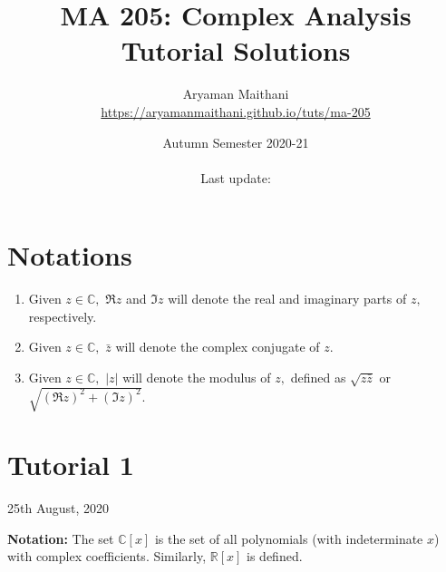 \documentclass[12pt]{article}
\title{MA 205: Complex Analysis\\\large{Tutorial Solutions}}
\author{Aryaman Maithani\\\url{https://aryamanmaithani.github.io/tuts/ma-205}}
\date{Autumn Semester 2020-21\\~\\Last update: \DTMnow}
\theoremstyle{definition}
\numberwithin{thm}{section}
\begin{document}
\maketitle
\setcounter{section}{-1}
\section{Notations}
\begin{enumerate}
	\item Given $z \in \mathbb{C},$ $\Re z$ and $\Im z$ will denote the real and imaginary parts of $z,$ respectively.
	\item Given $z \in \mathbb{C},$ $\bar{z}$ will denote the complex conjugate of $z.$
	\item Given $z \in \mathbb{C},$ $\left|z\right|$ will denote the modulus of $z,$ defined as $\sqrt{z\bar{z}}$ or $\sqrt{\left(\Re z\right)^2 + \left(\Im z\right)^2}.$
\end{enumerate}
\newpage\section{Tutorial 1}
\begin{center}
	25th August, 2020
\end{center}
\textbf{Notation:} The set $\mathbb{C}[x]$ is the set of all polynomials (with indeterminate $x$) with complex coefficients. Similarly, $\mathbb{R}[x]$ is defined.
\end{document}
